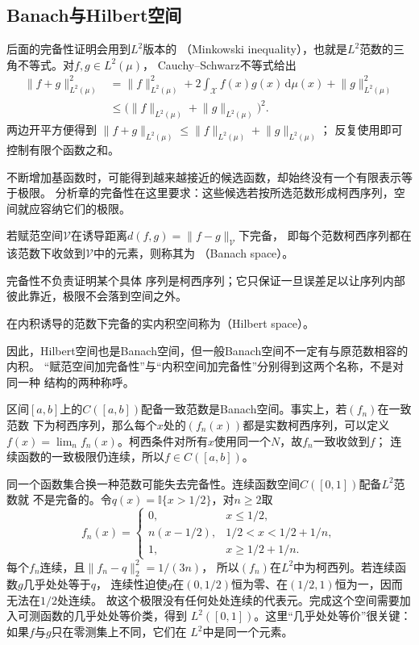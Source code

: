 \subsection{Banach与Hilbert空间}

后面的完备性证明会用到$L^2$版本的
（Minkowski inequality），也就是$L^2$范数的三角不等式。对$f,g\in L^2(\mu)$，
Cauchy--Schwarz不等式给出
\[
  \begin{aligned}
  \lVert f+g\rVert_{L^2(\mu)}^2
  &=
  \lVert f\rVert_{L^2(\mu)}^2
  +
  2\int_{\mathcal{X}}f(x)g(x)\,\mathrm{d}\mu(x)
  +\lVert g\rVert_{L^2(\mu)}^2\\
  &\leq
  \bigl(
    \lVert f\rVert_{L^2(\mu)}
    +
    \lVert g\rVert_{L^2(\mu)}
  \bigr)^2.
  \end{aligned}
\]
两边开平方便得到
$\lVert f+g\rVert_{L^2(\mu)}
\leq\lVert f\rVert_{L^2(\mu)}+\lVert g\rVert_{L^2(\mu)}$；
反复使用即可控制有限个函数之和。

不断增加基函数时，可能得到越来越接近的候选函数，却始终没有一个有限表示等于极限。
分析章的完备性在这里要求：这些候选若按所选范数形成柯西序列，空间就应容纳它们的极限。
\begin{definition}[Banach空间]
\label{def:functional-banach-space}
若赋范空间$\mathcal V$在诱导距离$d(f,g)=\lVert f-g\rVert_{\mathcal V}$下完备，
即每个范数柯西序列都在该范数下收敛到$\mathcal V$中的元素，则称其为
（Banach space）。
\end{definition}
完备性不负责证明某个具体
序列是柯西序列；它只保证一旦误差足以让序列内部彼此靠近，极限不会落到空间之外。

\begin{definition}[Hilbert空间]
\label{def:functional-hilbert-space}
在内积诱导的范数下完备的实内积空间称为（Hilbert space）。
\end{definition}
因此，Hilbert空间也是Banach空间，但一般Banach空间不一定有与原范数相容的内积。
“赋范空间加完备性”与“内积空间加完备性”分别得到这两个名称，不是对同一种
结构的两种称呼。

区间$[a,b]$上的$C([a,b])$配备一致范数是Banach空间。事实上，若$(f_n)$在一致范数
下为柯西序列，那么每个$x$处的$(f_n(x))$都是实数柯西序列，可以定义
$f(x)=\lim_n f_n(x)$。柯西条件对所有$x$使用同一个$N$，故$f_n$一致收敛到$f$；
连续函数的一致极限仍连续，所以$f\in C([a,b])$。

同一个函数集合换一种范数可能失去完备性。连续函数空间$C([0,1])$配备$L^2$范数就
不是完备的。令$q(x)=\mathbb{I}\{x>1/2\}$，对$n\geq2$取
\[
 f_n(x)=
 \begin{cases}
  0,&x\leq1/2,\\
  n(x-1/2),&1/2<x<1/2+1/n,\\
  1,&x\geq1/2+1/n.
 \end{cases}
\]
每个$f_n$连续，且$\lVert f_n-q\rVert_2^2=1/(3n)$，
所以$(f_n)$在$L^2$中为柯西列。若连续函数$g$几乎处处等于$q$，
连续性迫使$g$在$(0,1/2)$恒为零、在$(1/2,1)$恒为一，因而无法在$1/2$处连续。
故这个极限没有任何处处连续的代表元。完成这个空间需要加入可测函数的几乎处处等价类，得到
$L^2([0,1])$。这里“几乎处处等价”很关键：如果$f$与$g$只在零测集上不同，它们在
$L^2$中是同一个元素。

